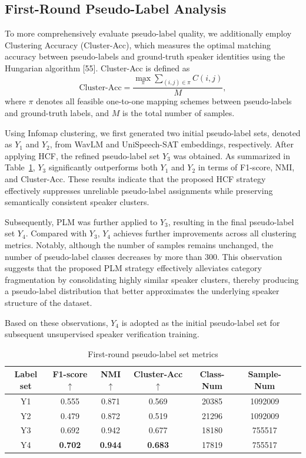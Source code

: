 \documentclass[lettersize,journal]{IEEEtran}
\begin{document}
\subsection{First-Round Pseudo-Label Analysis}
To more comprehensively evaluate pseudo-label quality, we additionally employ Clustering Accuracy (Cluster-Acc), which measures the optimal matching accuracy between pseudo-labels and ground-truth speaker identities using the Hungarian algorithm [55]. Cluster-Acc is defined as
\begin{equation}
\mathrm{Cluster\mbox{-}Acc}
=
\frac{
\max_{\pi}
\sum_{(i,j)\in\pi}
C(i,j)
}{
M
},
\end{equation}
where $\pi$ denotes all feasible one-to-one mapping schemes between pseudo-labels and ground-truth labels, and $M$ is the total number of samples.

Using Infomap clustering, we first generated two initial pseudo-label sets, denoted as $Y_1$ and $Y_2$, from WavLM and UniSpeech-SAT embeddings, respectively. After applying HCF, the refined pseudo-label set $Y_3$ was obtained. As summarized in Table~\ref{tab:First-round pseudo-label set metrics}, $Y_3$ significantly outperforms both $Y_1$ and $Y_2$ in terms of F1-score, NMI, and Cluster-Acc. These results indicate that the proposed HCF strategy effectively suppresses unreliable pseudo-label assignments while preserving semantically consistent speaker clusters.

Subsequently, PLM was further applied to $Y_3$, resulting in the final pseudo-label set $Y_4$. Compared with $Y_3$, $Y_4$ achieves further improvements across all clustering metrics. Notably, although the number of samples remains unchanged, the number of pseudo-label classes decreases by more than 300. This observation suggests that the proposed PLM strategy effectively alleviates category fragmentation by consolidating highly similar speaker clusters, thereby producing a pseudo-label distribution that better approximates the underlying speaker structure of the dataset.

Based on these observations, $Y_4$ is adopted as the initial pseudo-label set for subsequent unsupervised speaker verification training.
\begin{table}[!t] %
    \centering
    \caption{First-round pseudo-label set metrics} %
    \setlength{\tabcolsep}{4pt} %
    \begin{tabular}{c c c c c c c} %
        \hline
        Label set  & F1-score$\uparrow$ & NMI$\uparrow$ & Cluster-Acc$\uparrow$ & Class-Num & Sample-Num \\
        \hline
        Y1    & 0.555 & 0.871 & 0.569  & 20385  &1092009  \\    
        Y2     & 0.479  & 0.872 & 0.519 & 21296 & 1092009  \\         
        Y3     & 0.692 & 0.942 & 0.677  & 18180   & 755517   \\
        Y4     & \textbf{0.702} & \textbf{0.944} & \textbf{0.683} &  17819  &  755517     \\
        \hline
    \end{tabular}
    \label{tab:First-round pseudo-label set metrics}
\end{table}
\end{document}
